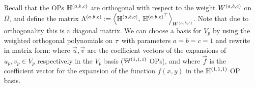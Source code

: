 Recall that the OPs $\mathbb{H}^{(a,b,c)}$ are orthogonal with respect to the weight ${W^{(a,b,c)}}$ on $\Omega$, and define the matrix $\Lambda^{(a,b,c)} :=  \ip< \bighdop^{(a,b,c)}, \: {\bighdop^{(a,b,c)}}^\top >_{\Wabc}$. Note that due to orthogonality this is a diagonal matrix. We can choose a basis for $V_p$ by using the weighted orthogonal polynomials on $\tau$ with parameters $a = b = c = 1$
and rewrite  in matrix form:
where $\vec{u}, \vec{v}$ are the coefficient vectors of the expansions of $u_p, v_p \in V_p$ respectively in the $V_p$ basis (${\mathbb{W}^{(1,1,1)}}$ OPs), and
where $\vec{f}$ is the coefficient vector for the expansion of the function $f(x,y)$ in the ${\mathbb{H}^{(1,1,1)}}$ OP basis.

